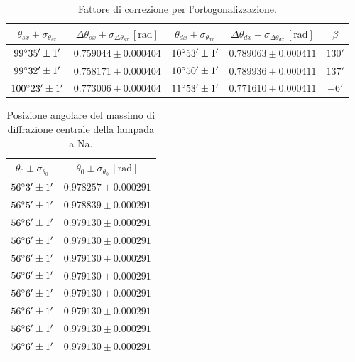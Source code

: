 \documentclass[]{article}
\begin{document}
    \begin{table}[H]
        \centering
        \begin{tabular}{||c|c|c|c|c||}
            \hline
            $\theta_{sx} \pm \sigma_{\theta_{sx}}$ & $\Delta\theta_{sx} \pm \sigma_{\Delta\theta_{sx}} \, \left[\text{rad}\right]$ & $\theta_{dx} \pm \sigma_{\theta_{dx}}$ & $\Delta\theta_{dx} \pm \sigma_{\Delta\theta_{dx}} \, \left[\text{rad}\right]$ & $\beta$ \\\hline
            \hline
            $99\degree  35' \pm 1'$ & $0.759044 \pm 0.000404$ & $10\degree 53' \pm 1'$ & $0.789063 \pm 0.000411$ & $130'$ \\\hline
            $99\degree  32' \pm 1'$ & $0.758171 \pm 0.000404$ & $10\degree 50' \pm 1'$ & $0.789936 \pm 0.000411$ & $137'$ \\\hline
            $100\degree 23' \pm 1'$ & $0.773006 \pm 0.000404$ & $11\degree 53' \pm 1'$ & $0.771610 \pm 0.000411$ & $ -6'$ \\\hline
        \end{tabular}
        \caption{Fattore di correzione per l'ortogonalizzazione.}
        \label{prel-ort}
    \end{table}

    \begin{table}[H]
        \centering
        \begin{tabular}{||c|c||}
            \hline
            $\theta_0 \pm \sigma_{\theta_0}$ & $\theta_0 \pm \sigma_{\theta_0} \, \left[\text{rad}\right]$ \\\hline
            \hline
            $56\degree 3' \pm 1'$ & $0.978257 \pm 0.000291$ \\\hline
            $56\degree 5' \pm 1'$ & $0.978839 \pm 0.000291$ \\\hline
            $56\degree 6' \pm 1'$ & $0.979130 \pm 0.000291$ \\\hline
            $56\degree 6' \pm 1'$ & $0.979130 \pm 0.000291$ \\\hline
            $56\degree 6' \pm 1'$ & $0.979130 \pm 0.000291$ \\\hline
            $56\degree 6' \pm 1'$ & $0.979130 \pm 0.000291$ \\\hline
            $56\degree 6' \pm 1'$ & $0.979130 \pm 0.000291$ \\\hline
            $56\degree 6' \pm 1'$ & $0.979130 \pm 0.000291$ \\\hline
            $56\degree 6' \pm 1'$ & $0.979130 \pm 0.000291$ \\\hline
            $56\degree 6' \pm 1'$ & $0.979130 \pm 0.000291$ \\\hline
        \end{tabular}
        \caption{Posizione angolare del massimo di diffrazione centrale della lampada a Na.}
        \label{max-Na}
    \end{table}
\end{document}

